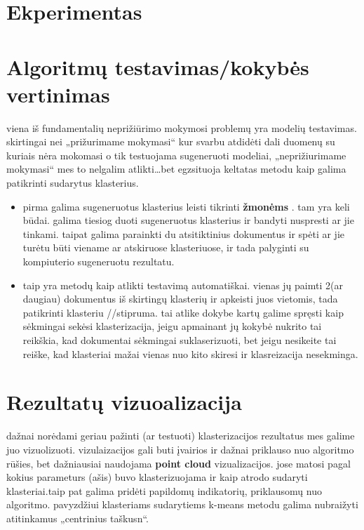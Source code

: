 \documentclass{VUMIFInfKursinis}
\begin{document}
\section{Ekperimentas}
\section{Algoritmų testavimas/kokybės vertinimas}
	viena iš fundamentalių neprižiūrimo mokymosi problemų yra modelių testavimas. skirtingai nei „prižurimame mokymasi“ kur svarbu atdidėti dali duomenų su kuriais nėra mokomasi o tik testuojama sugeneruoti modeliai, „neprižiurimame mokymasi“ mes to nelgalim atlikti\ldots bet egzsituoja keltatas metodu kaip galima patikrinti sudarytus klasterius.
	\begin{itemize}
		\item pirma galima sugeneruotus klasterius leisti tikrinti \textbf{žmonėms }. tam yra keli būdai. galima tiesiog duoti sugeneruotus klasterius ir bandyti nuspresti ar jie tinkami. taipat galima parainkti du atsitiktinius dokumentus ir spėti ar jie turėtu būti viename ar atskiruose klasteriuose, ir tada palyginti su kompiuterio sugeneruotu rezultatu. 
		\item taip yra metodų kaip atlikti testavimą automatiškai. vienas jų paimti 2(ar daugiau) dokumentus iš skirtingų klasterių ir apkeisti juos vietomis, tada patikrinti klasteriu //stipruma. tai atlike dokybe kartų galime spręsti kaip sėkmingai sekėsi klasterizacija, jeigu apmainant jų kokybė nukrito tai reikškia, kad dokumentai sėkmingai suklaserizuoti, bet jeigu nesikeite tai reiške, kad klasteriai mažai vienas nuo kito skiresi ir klasreizacija nesekminga.
	\end{itemize}

\section{Rezultatų vizuoalizacija}
	dažnai norėdami geriau pažinti (ar testuoti) klasterizacijos rezultatus mes galime juo vizuolizuoti. vizulaizacijos gali buti įvairios ir dažnai priklauso nuo algoritmo rūšies, bet dažniausiai naudojama \textbf{point cloud} vizualizacijos. jose matosi pagal kokius parameturs (ašis) buvo klasterizuojama ir kaip atrodo sudaryti klasteriai.taip pat galima pridėti papildomų indikatorių, priklausomų nuo algoritmo. pavyzdžiui klasteriams sudarytiems k-means metodu galima nubraižyti atitinkamus „centrinius taškusn“.

\end{document}

